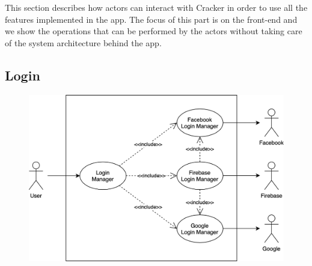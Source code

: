 This section describes how actors can interact with Cracker in order to use all the features implemented in the app. The focus of this part is on the front-end and we show the operations that can be performed by the actors without taking care of the system architecture behind the app.

\vspace{6mm}

\subsection{Login}
\begin{figure}[h]
\centering
\includegraphics[width=\textwidth]{img/usecases/login}
\end{figure}

\clearpage

